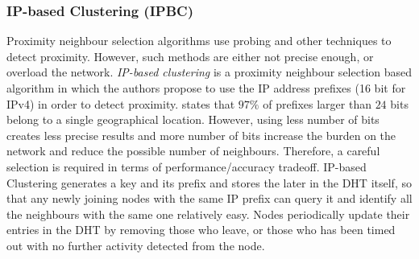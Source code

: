 %
%
%

\subsubsection{IP-based Clustering (IPBC)}
Proximity neighbour selection algorithms use probing and other techniques to
detect proximity. However, such methods are either not precise enough, or
overload the network. \emph{IP-based clustering} \cite{karwaczynski_ipbc_2007}
is a proximity neighbour selection based algorithm in which the authors propose
to use the IP address prefixes (16 bit for IPv4) in order to detect proximity.
\cite{freedman_iploc_2005} states that $97\%$ of prefixes larger than $24$ bits
belong to a single geographical location. However, using less number of bits
creates less precise results and more number of bits increase the burden on the
network and reduce the possible number of neighbours. Therefore, a careful
selection is required in terms of performance/accuracy tradeoff. IP-based
Clustering generates a key and its prefix and stores the later in the DHT
itself, so that any newly joining nodes with the same IP prefix can query it and
identify all the neighbours with the same one relatively easy. Nodes
periodically update their entries in the DHT by removing those who leave, or
those who has been timed out with no further activity detected from the node.


